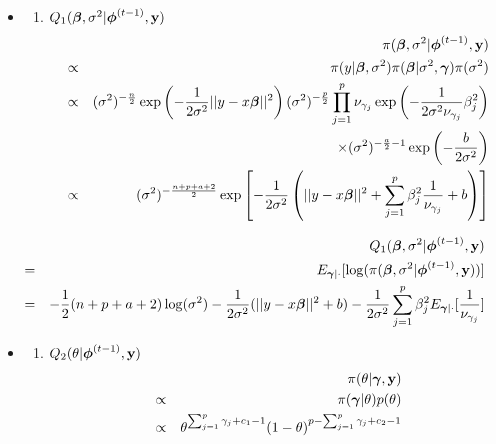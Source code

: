 \documentclass[]{book}
\providecommand{\tightlist}{%
  \setlength{\itemsep}{0pt}\setlength{\parskip}{0pt}}
\begin{document}
\begin{itemize}
\item
  \begin{enumerate}
  \def\labelenumi{(\arabic{enumi})}
  \tightlist
  \item
    \(Q_1({\boldsymbol \beta},\sigma^2|{\boldsymbol \phi}^{(t-1)},{\bf y})\)
    \begin{eqnarray*}
          &&\pi({\boldsymbol \beta},\sigma^2|{\boldsymbol \phi}^{(t-1)},{\bf y})\\
          &\propto& \pi(y|{\boldsymbol \beta},\sigma^2)\pi({\boldsymbol \beta}|\sigma^2,{\boldsymbol \gamma})\pi(\sigma^2)\\
          &\propto& (\sigma^2)^{-\frac{n}{2}}\exp\left(-\frac{1}{2\sigma^2}||y-x{\boldsymbol \beta}||^2\right)
          (\sigma^2)^{-\frac{p}{2}}\prod_{j=1}^{p}\nu_{\gamma_j}\exp\left(-\frac{1}{2\sigma^2\nu_{\gamma_j}}\beta_j^2\right)\\
          &&\times (\sigma^2)^{-\frac{a}{2}-1}\exp\left(-\frac{b}{2\sigma^2}\right)\\
          &\propto& (\sigma^2)^{-\frac{n+p+a+2}{2}}\exp\left[-\frac{1}{2\sigma^2}\left(||y-x{\boldsymbol \beta}||^2+
          \sum_{j=1}^{p}\beta_j^2\frac{1}{\nu_{\gamma_j}}+b\right)\right]
    \end{eqnarray*}
  \end{enumerate}
\end{itemize}

\begin{eqnarray*}
            &&Q_1({\boldsymbol \beta},\sigma^2|{\boldsymbol \phi}^{(t-1)},{\bf y})\\
            &=& E_{{\boldsymbol \gamma}|\cdot}[\log(\pi({\boldsymbol \beta},\sigma^2|{\boldsymbol \phi}^{(t-1)},{\bf y}))]\\
            &=& -\frac{1}{2}(n+p+a+2)\log(\sigma^2)-\frac{1}{2\sigma^2}(||y-x{\boldsymbol \beta}||^2+b)-\frac{1}{2\sigma^2}
            \sum_{j=1}^{p}\beta_j^2E_{{\boldsymbol \gamma}|\cdot}[\frac{1}{\nu_{\gamma_j}}]
\end{eqnarray*}

\begin{itemize}
\item
  \begin{enumerate}
  \def\labelenumi{(\arabic{enumi})}
  \setcounter{enumi}{1}
  \tightlist
  \item
    \(Q_2(\theta|{\boldsymbol \phi}^{(t-1)},{\bf y})\)
    \begin{eqnarray*}
          &&\pi(\theta|{\boldsymbol \gamma},{\bf y})\\
          &\propto& \pi({\boldsymbol \gamma}|\theta)p(\theta)\\
          &\propto& \theta^{\sum_{j=1}^{p}\gamma_j+c_1-1}(1-\theta)^{p-\sum_{j=1}^{p}\gamma_j+c_2-1}
    \end{eqnarray*}
  \end{enumerate}
\end{itemize}
\end{document}
